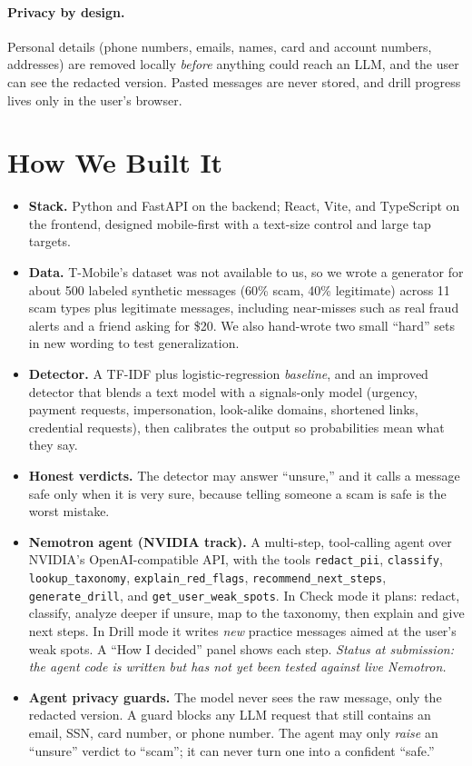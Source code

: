 \documentclass[11pt]{article}
\begin{document}
\paragraph{Privacy by design.}
Personal details (phone numbers, emails, names, card and account numbers, addresses) are removed locally \emph{before} anything could reach an LLM, and the user can see the redacted version. Pasted messages are never stored, and drill progress lives only in the user's browser.

\section*{How We Built It}
\begin{itemize}
  \item \textbf{Stack.} Python and FastAPI on the backend; React, Vite, and TypeScript on the frontend, designed mobile-first with a text-size control and large tap targets.
  \item \textbf{Data.} T-Mobile's dataset was not available to us, so we wrote a generator for about 500 labeled synthetic messages (60\% scam, 40\% legitimate) across 11 scam types plus legitimate messages, including near-misses such as real fraud alerts and a friend asking for \$20. We also hand-wrote two small ``hard'' sets in new wording to test generalization.
  \item \textbf{Detector.} A TF-IDF plus logistic-regression \emph{baseline}, and an improved detector that blends a text model with a signals-only model (urgency, payment requests, impersonation, look-alike domains, shortened links, credential requests), then calibrates the output so probabilities mean what they say.
  \item \textbf{Honest verdicts.} The detector may answer ``unsure,'' and it calls a message safe only when it is very sure, because telling someone a scam is safe is the worst mistake.
  \item \textbf{Nemotron agent (NVIDIA track).} A multi-step, tool-calling agent over NVIDIA's OpenAI-compatible API, with the tools \texttt{redact\_pii}, \texttt{classify}, \texttt{lookup\_taxonomy}, \texttt{explain\_red\_flags}, \texttt{recommend\_next\_steps}, \texttt{generate\_drill}, and \texttt{get\_user\_weak\_spots}. In Check mode it plans: redact, classify, analyze deeper if unsure, map to the taxonomy, then explain and give next steps. In Drill mode it writes \emph{new} practice messages aimed at the user's weak spots. A ``How I decided'' panel shows each step. \emph{Status at submission: the agent code is written but has not yet been tested against live Nemotron.}
  \item \textbf{Agent privacy guards.} The model never sees the raw message, only the redacted version. A guard blocks any LLM request that still contains an email, SSN, card number, or phone number. The agent may only \emph{raise} an ``unsure'' verdict to ``scam''; it can never turn one into a confident ``safe.''
\end{itemize}
\end{document}
